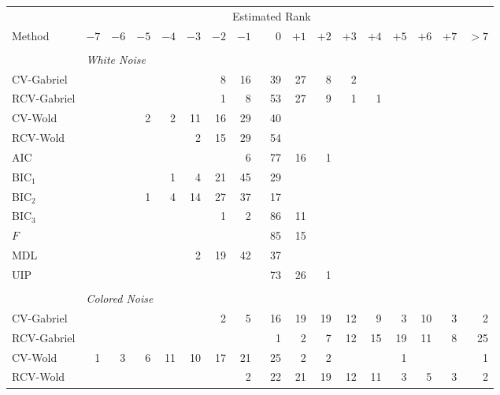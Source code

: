 \begin{table}
    \tiny
    \centering
    \begin{tabular}{lrrrrrrrrrrrrrrrr}
        \toprule
        &\multicolumn{15}{c}{\scriptsize{Estimated Rank}} \\
        \cmidrule{2-17}
        \scriptsize{Method}
            & $-7$ & $-6$ & $-5$ & $-4$ & $-3$ & $-2$ & $-1$ 
            & $\phantom{+}0$ 
            & $+1$ & $+2$ & $+3$ & $+4$ & $+5$ & $+6$ & $+7$ & $> 7$ \\
        \midrule
        \\
        &\multicolumn{16}{l}{\scriptsize{\textit{White Noise}}} \\
CV-Gabriel &  &  &  &  &  &  8 &  16 &  39 &  27 &  8 &  2 &  &  &  &  & \\ 
 RCV-Gabriel &  &  &  &  &  &  1 &  8 &  53 &  27 &  9 &  1 &  1 &  &  &  & \\ 
 CV-Wold &  &  &  2 &  2 &  11 &  16 &  29 &  40 &  &  &  &  &  &  &  & \\ 
 RCV-Wold &  &  &  &  &  2 &  15 &  29 &  54 &  &  &  &  &  &  &  & \\ 
 AIC &  &  &  &  &  &  &  6 &  77 &  16 &  1 &  &  &  &  &  & \\ 
 BIC$_1$ &  &  &  &  1 &  4 &  21 &  45 &  29 &  &  &  &  &  &  &  & \\ 
 BIC$_2$ &  &  &  1 &  4 &  14 &  27 &  37 &  17 &  &  &  &  &  &  &  & \\ 
 BIC$_3$ &  &  &  &  &  &  1 &  2 &  86 &  11 &  &  &  &  &  &  & \\ 
 $F$ &  &  &  &  &  &  &  &  85 &  15 &  &  &  &  &  &  & \\ 
 MDL &  &  &  &  &  2 &  19 &  42 &  37 &  &  &  &  &  &  &  & \\ 
 UIP &  &  &  &  &  &  &  &  73 &  26 &  1 &  &  &  &  &  & \\ 
         \\
        &\multicolumn{16}{l}{\scriptsize{\textit{Colored Noise}}} \\
CV-Gabriel &  &  &  &  &  &  2 &  5 &  16 &  19 &  19 &  12 &  9 &  3 &  10 &  3 &  2\\ 
 RCV-Gabriel &  &  &  &  &  &  &  &  1 &  2 &  7 &  12 &  15 &  19 &  11 &  8 &  25\\ 
 CV-Wold &  1 &  3 &  6 &  11 &  10 &  17 &  21 &  25 &  2 &  2 &  &  &  1 &  &  &  1\\ 
 RCV-Wold &  &  &  &  &  &  &  2 &  22 &  21 &  19 &  12 &  11 &  3 &  5 &  3 &  2\\ 

\end{tabular}
\end{table}
